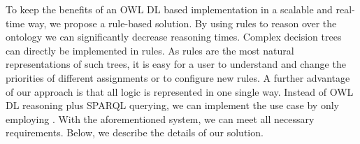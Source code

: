 To keep the benefits of an OWL DL based implementation in a scalable and real-time way, we propose a rule-based solution. %
 By using rules to reason over the ontology
 we can significantly decrease reasoning times.
Complex decision trees can directly be implemented in rules. %
 As rules are the most natural representations of such trees, 
 it is easy for a user to understand and change the priorities of different assignments 
 or to configure new rules. A further advantage of our approach is that all logic is represented in one single way. Instead of
 OWL DL reasoning plus SPARQL querying, we can implement the use case by only employing \nthreelogic. With the aforementioned system, we can meet all necessary requirements.
% 
% 
% 
% 
% 
Below, we describe the details of our solution.

